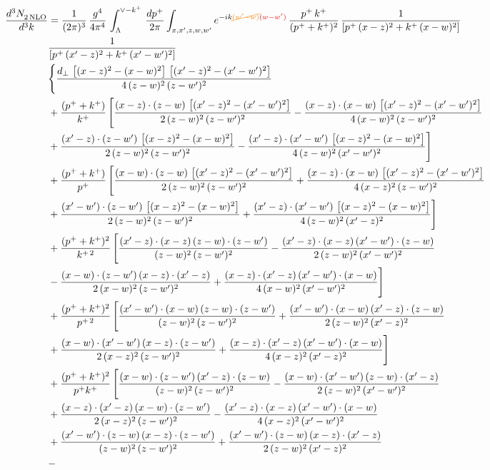 \documentclass[9pt]{article}
\numberwithin{equation}{section}
\begin{document}
\begin{align}
    \frac{d^{3}N_{2\,\rm NLO}^{\rm}}{d^{3}k}  & = \frac{1}{(2\pi)^{3}}\, \frac{g^{4}}{4\pi^{4}}\,\int_{\Lambda}^{\vee-k^{+}}\, \frac{dp^{+}}{2\pi}\int_{x,x',z,w,w^{\prime}} e^{-ik{\color{orange}\cancel{(w^{\prime}-w)}}{\color{red}(w-w^{\prime})}}\,\frac{p^{+}\,k^{+}}{(p^{+}+k^{+})^{2}}\, \frac{1}{\left[p^{+}\,(x-z)^{2}+k^{+}\,(x-w)^{2}\right]}\,\notag \\ & \frac{1}{\left[p^{+}\,(x'-z)^{2}+k^{+}\,(x'-w')^{2}\right]}\notag \\ & \Bigg\{\frac{d_{\perp}\, \left[(x-z)^{2}-(x-w)^{2}\right]\, \left[(x'-z)^{2}-(x'-w')^{2}\right]}{4\, (z-w)^{2}\, (z-w')^{2}}\notag \\ & +\frac{(p^{+}+k^{+})}{k^{+}}\,\Bigg[\frac{(x-z)\cdot (z-w)\, \left[(x'-z)^{2}-(x'-w')^{2}\right]}{2\, (z-w)^{2}\, (z-w')^{2}}  - \frac{(x-z)\cdot (x-w)\,\left[(x'-z)^{2}-(x'-w')^{2}\right] }{4\,(x-w)^{2}\,(z-w')^{2}}\notag \\ & +\frac{(x'-z)\cdot (z-w')\, \left[(x-z)^{2}-(x-w)^{2}\right]}{2\, (z-w)^{2}\, (z-w')^{2}}-\frac{(x'-z)\cdot (x'-w')\, \left[(x-z)^{2}-(x-w)^{2}\right]}{4\, (z-w)^{2}\,(x'-w')^{2}}\Bigg]\notag \\ & +\frac{(p^{+}+k^{+})}{p^{+}}\,\Bigg[\frac{(x-w)\cdot (z-w)\, \left[(x'-z)^{2}-(x'-w')^{2}\right]}{2\, (z-w)^{2}\, (z-w')^{2}}  + \frac{(x-z)\cdot (x-w)\,\left[(x'-z)^{2}-(x'-w')^{2}\right] }{4\,(x-z)^{2}\,(z-w')^{2}}\notag \\ & +\frac{(x'-w')\cdot (z-w')\, \left[(x-z)^{2}-(x-w)^{2}\right]}{2\, (z-w)^{2}\, (z-w')^{2}}+ \frac{(x'-z)\cdot (x'-w')\, \left[(x-z)^{2}-(x-w)^{2}\right]}{4\, (z-w)^{2}\,(x'-z)^{2}}\Bigg]\notag \\ & + \frac{(p^{+}+k^{+})^{2}}{k^{+\,2}}\,\Bigg[\frac{(x'-z)\cdot (x-z)\, (z-w)\cdot (z-w')}{(z-w)^{2}\, (z-w')^{2}}-\frac{(x'-z)\cdot (x-z)\, (x'-w')\cdot (z-w)}{2\, (z-w)^{2}\, (x'-w')^{2}}\notag \\ & -\frac{(x-w)\cdot (z-w')\, (x-z)\cdot (x'-z)}{2\, (x-w)^{2}\, (z-w')^{2}}+\frac{(x-z)\cdot (x'-z)\, (x'-w')\cdot (x-w)}{4\, (x-w)^{2}\, (x'-w')^{2}}\Bigg]\notag \\ & + \frac{(p^{+}+k^{+})^{2}}{p^{+\,2}}\, \Bigg[\frac{(x'-w')\cdot (x-w)\, (z-w)\cdot (z-w')}{(z-w)^{2}\, (z-w')^{2}}+\frac{(x'-w')\cdot (x-w)\, (x'-z)\cdot (z-w)}{2\, (z-w)^{2}\, (x'-z)^{2}}\notag \\ & +\frac{(x-w)\cdot (x'-w')\, (x-z)\cdot (z-w')}{2\, (x-z)^{2}\, (z-w')^{2}}+\frac{(x-z)\cdot (x'-z)\, (x'-w')\cdot (x-w)}{4\, (x-z)^{2}\, (x'-z)^{2}}\Bigg]\notag \\ & + \frac{(p^{+}+k^{+})^{2}}{p^{+}k^{+}}\, \Bigg[\frac{(x-w)\cdot (z-w')\, (x'-z)\cdot (z-w)}{(z-w)^{2}\,(z-w')^{2}}-\frac{(x-w)\cdot (x'-w')\, (z-w)\cdot (x'-z)}{2\, (z-w)^{2}\, (x'-w')^{2}}\notag \\ & + \frac{(x-z)\cdot (x'-z)\, (x-w)\cdot (z-w')}{2\, (x-z)^{2}\, (z-w')^{2}}-\frac{(x'-z)\cdot (x-z)\, (x'-w')\cdot (x-w)}{4\, (x-z)^{2}\, (x'-w')^{2}}\notag \\ & + \frac{(x'-w')\cdot (z-w)\, (x-z)\cdot (z-w')}{(z-w)^{2}\,(z-w')^{2}}+\frac{(x'-w')\cdot (z-w)\, (x-z)\cdot (x'-z)}{2\, (z-w)^{2}\, (x'-z)^{2}}\notag \\ & - 
\end{align}
\end{document}
